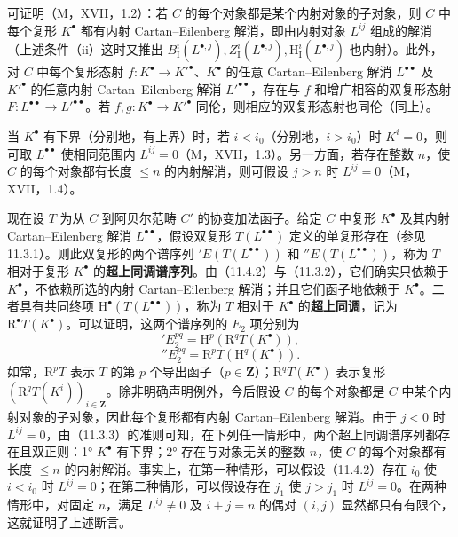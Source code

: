 可证明（M，XVII，1.2）：若 $C$ 的每个对象都是某个内射对象的子对象，则 $C$ 中每个复形 $K^\bullet$ 都有内射 Cartan--Eilenberg 解消，即由内射对象 $L^{ij}$ 组成的解消（上述条件（ii）这时又推出 $B_{\mathrm I}^i(L^{\bullet,j}),Z_{\mathrm I}^i(L^{\bullet,j}),\mathrm H_{\mathrm I}^i(L^{\bullet,j})$ 也内射）。此外，对 $C$ 中每个复形态射 $f:K^\bullet\to K'^\bullet$、$K^\bullet$ 的任意 Cartan--Eilenberg 解消 $L^{\bullet\bullet}$ 及 $K'^\bullet$ 的任意内射 Cartan--Eilenberg 解消 $L'^{\bullet\bullet}$，存在与 $f$ 和增广相容的双复形态射 $F:L^{\bullet\bullet}\to L'^{\bullet\bullet}$。若 $f,g:K^\bullet\to K'^\bullet$ 同伦，则相应的双复形态射也同伦（同上）。

当 $K^\bullet$ 有下界（分别地，有上界）时，若 $i<i_0$（分别地，$i>i_0$）时 $K^i=0$，则可取 $L^{\bullet\bullet}$ 使相同范围内 $L^{ij}=0$（M，XVII，1.3）。另一方面，若存在整数 $n$，使 $C$ 的每个对象都有长度 $\leq n$ 的内射解消，则可假设 $j>n$ 时 $L^{ij}=0$（M，XVII，1.4）。

现在设 $T$ 为从 $C$ 到阿贝尔范畴 $C'$ 的协变加法函子。给定 $C$ 中复形 $K^\bullet$ 及其内射 Cartan--Eilenberg 解消 $L^{\bullet\bullet}$，假设双复形 $T(L^{\bullet\bullet})$ 定义的单复形存在（参见11.3.1）。则此双复形的两个谱序列 $'E(T(L^{\bullet\bullet}))$ 和 $''E(T(L^{\bullet\bullet}))$，称为 $T$ 相对于复形 $K^\bullet$ 的\textbf{超上同调谱序列}。由（11.4.2）与（11.3.2），它们确实只依赖于 $K^\bullet$，不依赖所选的内射 Cartan--Eilenberg 解消；并且它们函子地依赖于 $K^\bullet$。二者具有共同终项 $\mathrm H^\bullet(T(L^{\bullet\bullet}))$，称为 $T$ 相对于 $K^\bullet$ 的\textbf{超上同调}，记为 $\mathrm R^\bullet T(K^\bullet)$。可以证明，这两个谱序列的 $E_2$ 项分别为
\begin{equation}\tag{11.4.3.1}
'E_2^{pq}=\mathrm H^p(\mathrm R^qT(K^\bullet)),
\end{equation}
\begin{equation}\tag{11.4.3.2}
''E_2^{pq}=\mathrm R^pT(\mathrm H^q(K^\bullet)).
\end{equation}
如常，$\mathrm R^pT$ 表示 $T$ 的第 $p$ 个导出函子（$p\in\mathbf Z$）；$\mathrm R^qT(K^\bullet)$ 表示复形 $(\mathrm R^qT(K^i))_{i\in\mathbf Z}$。除非明确声明例外，今后假设 $C$ 的每个对象都是 $C$ 中某个内射对象的子对象，因此每个复形都有内射 Cartan--Eilenberg 解消。由于 $j<0$ 时 $L^{ij}=0$，由（11.3.3）的准则可知，在下列任一情形中，两个超上同调谱序列都存在且双正则：1° $K^\bullet$ 有下界；2° 存在与对象无关的整数 $n$，使 $C$ 的每个对象都有长度 $\leq n$ 的内射解消。事实上，在第一种情形，可以假设（11.4.2）存在 $i_0$ 使 $i<i_0$ 时 $L^{ij}=0$；在第二种情形，可以假设存在 $j_1$ 使 $j>j_1$ 时 $L^{ij}=0$。在两种情形中，对固定 $n$，满足 $L^{ij}\ne0$ 及 $i+j=n$ 的偶对 $(i,j)$ 显然都只有有限个，这就证明了上述断言。

